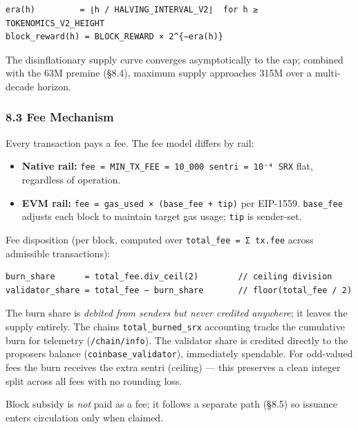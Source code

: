 \documentclass[11pt,a4paper]{article}
\providecommand{\tightlist}{\setlength{\itemsep}{0pt}\setlength{\parskip}{0pt}}
\begin{document}
\begin{verbatim}
era(h)         = ⌊h / HALVING_INTERVAL_V2⌋  for h ≥ TOKENOMICS_V2_HEIGHT
block_reward(h) = BLOCK_REWARD × 2^{−era(h)}
\end{verbatim}

The disinflationary supply curve converges asymptotically to the cap;
combined with the 63M premine (§8.4), maximum supply approaches 315M
over a multi-decade horizon.

\hypertarget{83-fee-mechanism}{%
\subsubsection{8.3 Fee Mechanism}\label{83-fee-mechanism}}

Every transaction pays a fee. The fee model differs by rail:

\begin{itemize}
\tightlist
\item
  \textbf{Native rail:}
  \texttt{fee\ =\ MIN\_TX\_FEE\ =\ 10\_000\ sentri\ =\ 10⁻⁴\ SRX} flat,
  regardless of operation.
\item
  \textbf{EVM rail:} \texttt{fee\ =\ gas\_used\ ×\ (base\_fee\ +\ tip)}
  per EIP-1559. \texttt{base\_fee} adjusts each block to maintain target
  gas usage; \texttt{tip} is sender-set.
\end{itemize}

Fee disposition (per block, computed over
\texttt{total\_fee\ =\ Σ\ tx.fee} across admissible transactions):

\begin{verbatim}
burn_share      = total_fee.div_ceil(2)        // ceiling division
validator_share = total_fee − burn_share       // floor(total_fee / 2)
\end{verbatim}

The burn share is \emph{debited from senders but never credited
anywhere}; it leaves the supply entirely. The chain\textquotesingle s
\texttt{total\_burned\_srx} accounting tracks the cumulative burn for
telemetry (\texttt{/chain/info}). The validator share is credited
directly to the proposer\textquotesingle s balance
(\texttt{coinbase\_validator}), immediately spendable. For odd-valued
fees the burn receives the extra sentri (ceiling) --- this preserves a
clean integer split across all fees with no rounding loss.

Block subsidy is \emph{not} paid as a fee; it follows a separate path
(§8.5) so issuance enters circulation only when claimed.
\end{document}
